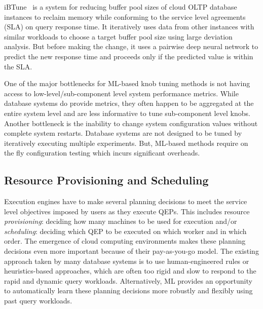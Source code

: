 iBTune~\cite{ibtune} is a system for reducing buffer pool sizes of cloud OLTP database instances to reclaim memory while conforming to the service level agreements (SLA) on query response time.
It iteratively uses data from other instances with similar workloads to choose a target buffer pool size using large deviation analysis.
But before making the change, it uses a pairwise deep neural network to predict the new response time and proceeds only if the predicted value is within the SLA.

One of the major bottlenecks for ML-based knob tuning methods is not having access to low-level/sub-component level system performance metrics.
While database systems do provide metrics, they often happen to be aggregated at the entire system level and are less informative to tune sub-component level knobs.
Another bottleneck is the inability to change system configuration values without complete system restarts.
Database systems are not designed to be tuned by iteratively executing multiple experiments. 
But, ML-based methods require on the fly configuration testing which incurs significant overheads.

\subsection{Resource Provisioning and Scheduling}
Execution engines have to make several planning decisions to meet the service level objectives imposed by users as they execute QEPs.
This includes resource \textit{provisioning}: deciding how many machines to be used for execution and/or \textit{scheduling}: deciding which QEP to be executed on which worker and in which order.
The emergence of cloud computing environments makes these planning decisions even more important because of their pay-as-you-go model.
The existing approach taken by many database systems is to use human-engineered rules or heuristics-based approaches, which are often too rigid and slow to respond to the rapid and dynamic query workloads.
Alternatively, ML provides an opportunity to automatically learn these planning decisions more robustly and flexibly using past query workloads.

